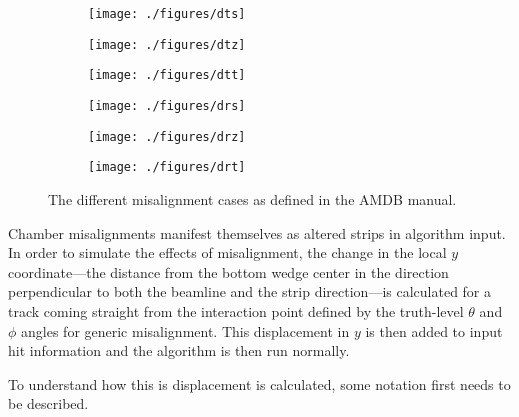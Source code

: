 \begin{figure}[!htbp]\captionsetup{justification=centering}
  \centering
  \begin{subfigure}{0.32\textwidth}\texttt{[image: ./figures/dts]}\end{subfigure}
  \begin{subfigure}{0.32\textwidth}\texttt{[image: ./figures/dtz]}\end{subfigure}
  \begin{subfigure}{0.32\textwidth}\texttt{[image: ./figures/dtt]}\end{subfigure}
  \begin{subfigure}{0.32\textwidth}\texttt{[image: ./figures/drs]}\end{subfigure}
  \begin{subfigure}{0.32\textwidth}\texttt{[image: ./figures/drz]}\end{subfigure}
  \begin{subfigure}{0.32\textwidth}\texttt{[image: ./figures/drt]}\end{subfigure}
  \caption{\label{fig:misalscheme}The different misalignment cases as defined in the AMDB manual.}
\end{figure}

Chamber misalignments manifest themselves as altered strips in algorithm input.  In order to simulate the effects of misalignment, the change in the local $y$ coordinate---the distance from the bottom wedge center in the direction perpendicular to both the beamline and the strip direction---is calculated for a track coming straight from the interaction point defined by the truth-level $\theta$ and $\phi$ angles for generic misalignment.  This displacement in $y$ is then added to input hit information and the algorithm is then run normally.

To understand how this is displacement is calculated, some notation first needs to be described.

